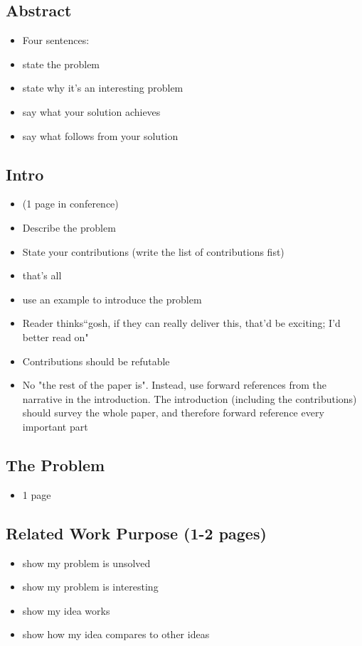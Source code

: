 \subsection{Abstract}
\begin{itemize}
\item Four sentences:
\item state the problem
\item state why it's an interesting problem
\item say what your solution achieves
\item say what follows from your solution
\end{itemize}

\subsection{Intro}
\begin{itemize}
\item (1 page in conference)
\item Describe the problem
\item State your contributions (write the list of contributions fist)
\item that's all
\item use an example to introduce the problem
\item Reader thinks``gosh, if they can really deliver this, that'd be exciting; I’d better read on" \cite{jones2013how}
\item Contributions should be refutable
\item No "the rest of the paper is". Instead, use forward references from the narrative in the introduction. The introduction (including the contributions) should survey the whole paper, and therefore forward reference every important part
\end{itemize}

\subsection{The Problem}
\begin{itemize}
\item 1 page
\end{itemize}

\subsection{Related Work Purpose (1-2 pages)}
\begin{itemize}
\item show my problem is unsolved
\item show my problem is interesting
\item show my idea works
\item show how my idea compares to other ideas
\end{itemize}

